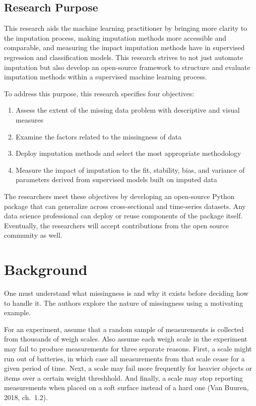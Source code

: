 \documentclass[12pt,oneside]{chicagocapstone}
\providecommand{\tightlist}{%
  \setlength{\itemsep}{0pt}\setlength{\parskip}{0pt}}
\begin{document}
\section*{Research Purpose}\label{research-purpose}

This research aids the machine learning practitioner by bringing more
clarity to the imputation process, making imputation methods more
accessible and comparable, and measuring the impact imputation methods
have in supervised regression and classification models. This research
strives to not just automate imputation but also develop an open-source
framework to structure and evaluate imputation methods within a
supervised machine learning process.

To address this purpose, this research specifies four objectives:
\begin{enumerate}
\def\labelenumi{\arabic{enumi}.}
\tightlist
\item
  Assess the extent of the missing data problem with descriptive and
  visual measures
\item
  Examine the factors related to the missingness of data
\item
  Deploy imputation methods and select the most appropriate methodology
\item
  Measure the impact of imputation to the fit, stability, bias, and
  variance of parameters derived from supervised models built on imputed
  data
\end{enumerate}
The researchers meet these objectives by developing an open-source
Python package that can generalize across cross-sectional and
time-series datasets. Any data science professional can deploy or reuse
components of the package itself. Eventually, the researchers will
accept contributions from the open source community as well.

\hypertarget{background}{\chapter*{Background}\label{background}}

One must understand what missingness is and why it exists before
deciding how to handle it. The authors explore the nature of missingness
using a motivating example.

For an experiment, assume that a random sample of measurements is
collected from thousands of weigh scales. Also assume each weigh scale
in the experiment may fail to produce measurements for three separate
reasons. First, a scale might run out of batteries, in which case all
measurements from that scale cease for a given period of time. Next, a
scale may fail more frequently for heavier objects or items over a
certain weight threshhold. And finally, a scale may stop reporting
measurements when placed on a soft surface instead of a hard one (Van
Buuren, 2018, ch.~1.2).
\end{document}
